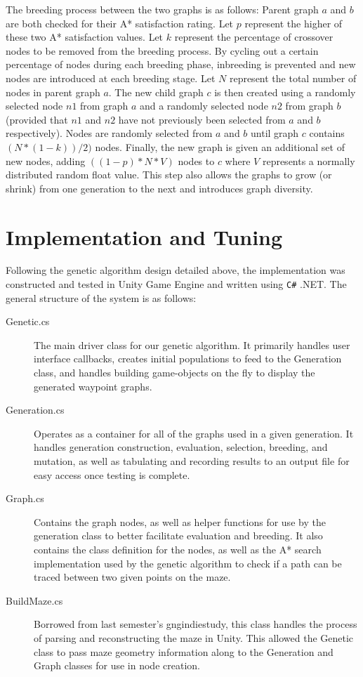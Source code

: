 	The breeding process between the two graphs is as follows: Parent graph \(a\) and \(b\) are both checked for their A* satisfaction rating. Let \(p\) represent the higher of these two A* satisfaction values. Let \(k\) represent the percentage of crossover nodes to be removed from the breeding process. By cycling out a certain percentage of nodes during each breeding phase, inbreeding is prevented and new nodes are introduced at each breeding stage. Let \(N\) represent the total number of nodes in parent graph \(a\). The new child graph \(c\) is then created using a randomly selected node \(n1\) from graph \(a\) and a randomly selected node \(n2\) from graph \(b\) (provided that \(n1\) and \(n2\) have not previously been selected from \(a\) and \(b\) respectively). Nodes are randomly selected from \(a\) and \(b\) until graph \(c\) contains \((N*(1-k))/2)\) nodes. Finally, the new graph is given an additional set of new nodes, adding \(((1-p)*N * V)\) nodes to \(c\) where \(V\) represents a normally distributed random float value. This step also allows the graphs to grow (or shrink) from one generation to the next and introduces graph diversity.

\section{Implementation and Tuning}

	Following the genetic algorithm design detailed above, the implementation was constructed and tested in Unity Game Engine and written using \texttt{C\#} .NET. The general structure of the system is as follows:	
	\begin{description}
		\item[Genetic.cs] The main driver class for our genetic algorithm. It primarily handles user interface callbacks, creates initial populations to feed to the Generation class, and handles building game-objects on the fly to display the generated waypoint graphs.
		\item[Generation.cs] Operates as a container for all of the graphs used in a given generation. It handles generation construction, evaluation, selection, breeding, and mutation, as well as tabulating and recording results to an output file for easy access once testing is complete.
		\item[Graph.cs] Contains the graph nodes, as well as helper functions for use by the generation class to better facilitate evaluation and breeding. It also contains the class definition for the nodes, as well as the A* search implementation used by the genetic algorithm to check if a path can be traced between two given points on the maze.
		\item[BuildMaze.cs] Borrowed from last semester's gngindiestudy, this class handles the process of parsing and reconstructing the maze in Unity. This allowed the Genetic class to pass maze geometry information along to the Generation and Graph classes for use in node creation.
	\end{description}
	
